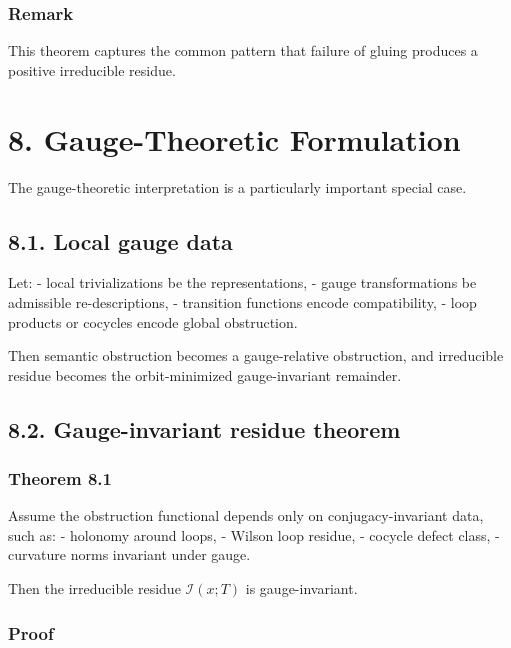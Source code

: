 \documentclass[
]{article}
\begin{document}
\subsubsection{Remark}\label{remark-1}

This theorem captures the common pattern that failure of gluing produces
a positive irreducible residue.

\section{8. Gauge-Theoretic
Formulation}\label{gauge-theoretic-formulation}

The gauge-theoretic interpretation is a particularly important special
case.

\subsection{8.1. Local gauge data}\label{local-gauge-data}

Let: - local trivializations be the representations, - gauge
transformations be admissible re-descriptions, - transition functions
encode compatibility, - loop products or cocycles encode global
obstruction.

Then semantic obstruction becomes a gauge-relative obstruction, and
irreducible residue becomes the orbit-minimized gauge-invariant
remainder.

\subsection{8.2. Gauge-invariant residue
theorem}\label{gauge-invariant-residue-theorem}

\subsubsection{Theorem 8.1}\label{theorem-8.1}

Assume the obstruction functional depends only on conjugacy-invariant
data, such as: - holonomy around loops, - Wilson loop residue, - cocycle
defect class, - curvature norms invariant under gauge.

Then the irreducible residue \(\mathcal{I}(x;T)\) is gauge-invariant.

\subsubsection{Proof}\label{proof-6}
\end{document}
